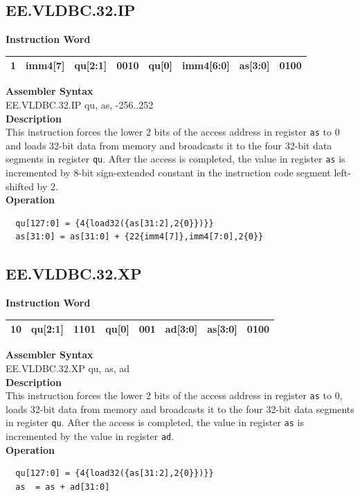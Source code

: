 \clearpage
\subsection{EE.VLDBC.32.IP}\label{instruction:EEVLDBC32IP}
\setlength\tabcolsep{6pt}
\textbf{Instruction Word} \\
\begin{tabular}{|c|c|c|c|c|c|c|c|}
	\hline
	1 & imm4[7] & qu[2:1] & 0010 & qu[0] & imm4[6:0] & as[3:0] & 0100 \\
	\hline
\end{tabular}

\textbf{Assembler Syntax} \\
EE.VLDBC.32.IP qu, as, -256..252 \\
\textbf{Description} \\
This instruction forces the lower 2 bits of the access address in register \lstinline{as} to 0 and loads 32-bit data from memory and broadcasts it to the four 32-bit data segments in register \lstinline{qu}. After the access is completed, the value in register \lstinline{as} is incremented by 8-bit sign-extended constant in the instruction code segment left-shifted by 2.\\
\textbf{Operation}
\begin{lstlisting}
  qu[127:0] = {4{load32({as[31:2],2{0}})}}
  as[31:0] = as[31:0] + {22{imm4[7]},imm4[7:0],2{0}}
\end{lstlisting}

\clearpage
\subsection{EE.VLDBC.32.XP}\label{instruction:EEVLDBC32XP}
\setlength\tabcolsep{6pt}
\textbf{Instruction Word} \\
\begin{tabular}{|c|c|c|c|c|c|c|c|}
	\hline
	10 & qu[2:1] & 1101 & qu[0] & 001 & ad[3:0] & as[3:0] & 0100 \\
	\hline
\end{tabular}

\textbf{Assembler Syntax} \\
EE.VLDBC.32.XP qu, as, ad \\
\textbf{Description} \\
This instruction forces the lower 2 bits of the access address in register \lstinline{as} to 0, loads 32-bit data from memory and broadcasts it to the four 32-bit data segments in register \lstinline{qu}. After the access is completed, the value in register \lstinline{as} is incremented by the value in register \lstinline{ad}.\\
\textbf{Operation}
\begin{lstlisting}
  qu[127:0] = {4{load32({as[31:2],2{0}})}}
  as  = as + ad[31:0]
\end{lstlisting}

